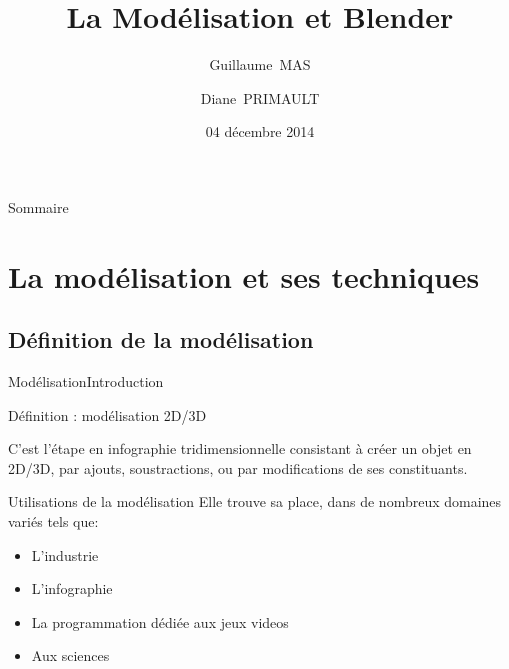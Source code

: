\documentclass{beamer}
\title{La Modélisation et Blender}
\author{Guillaume~MAS \and Diane~PRIMAULT}
\institute[Université Montpellier 2] %
{

  Licence 3 Informatique\\
  Université Montpellier 2}
\date{04 décembre 2014}
\begin{document}
\begin{frame}
  \titlepage
\end{frame}

\begin{frame}{Sommaire}
  \tableofcontents
\end{frame}


\section{La modélisation et ses techniques}




\subsection{Définition de la modélisation}

\begin{frame}{Modélisation}{Introduction}
    \begin{itemize}
        \begin{block}{Définition : modélisation 2D/3D}
            
                C'est l'étape en infographie tridimensionnelle consistant à créer un objet en 2D/3D, par ajouts, soustractions, ou par modifications de ses constituants.
            
        \end{block}
    
        \begin{block}{Utilisations de la modélisation}
            Elle trouve sa place, dans de nombreux domaines variés tels que: 
            \begin{itemize}
            \item L'industrie
            \item L'infographie
            \item La programmation dédiée aux jeux videos
            \item Aux sciences 
            \end{itemize}\\
               
        \end{block}
    \end{itemize}
        
\end{frame}
\end{document}
